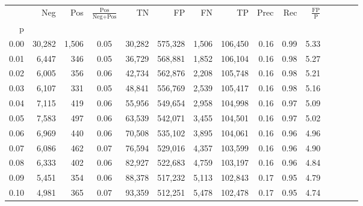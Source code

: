 \begin{tabular}{rrrcrrrrrrrrrrr}
\toprule
{} &     Neg &    Pos & $\frac{\text{Pos}}{\text{Neg}+\text{Pos}}$ &       TN &       FP &       FN &       TP &  Prec &   Rec & $\frac{\text{FP}}{\text{P}}$ \\
p    &         &        &                                            &          &          &          &          &       &       &                              \\
\midrule
0.00 &  30,282 &  1,506 &                                       0.05 &   30,282 &  575,328 &    1,506 &  106,450 &  0.16 &  0.99 &                         5.33 \\
0.01 &   6,447 &    346 &                                       0.05 &   36,729 &  568,881 &    1,852 &  106,104 &  0.16 &  0.98 &                         5.27 \\
0.02 &   6,005 &    356 &                                       0.06 &   42,734 &  562,876 &    2,208 &  105,748 &  0.16 &  0.98 &                         5.21 \\
0.03 &   6,107 &    331 &                                       0.05 &   48,841 &  556,769 &    2,539 &  105,417 &  0.16 &  0.98 &                         5.16 \\
0.04 &   7,115 &    419 &                                       0.06 &   55,956 &  549,654 &    2,958 &  104,998 &  0.16 &  0.97 &                         5.09 \\
0.05 &   7,583 &    497 &                                       0.06 &   63,539 &  542,071 &    3,455 &  104,501 &  0.16 &  0.97 &                         5.02 \\
0.06 &   6,969 &    440 &                                       0.06 &   70,508 &  535,102 &    3,895 &  104,061 &  0.16 &  0.96 &                         4.96 \\
0.07 &   6,086 &    462 &                                       0.07 &   76,594 &  529,016 &    4,357 &  103,599 &  0.16 &  0.96 &                         4.90 \\
0.08 &   6,333 &    402 &                                       0.06 &   82,927 &  522,683 &    4,759 &  103,197 &  0.16 &  0.96 &                         4.84 \\
0.09 &   5,451 &    354 &                                       0.06 &   88,378 &  517,232 &    5,113 &  102,843 &  0.17 &  0.95 &                         4.79 \\
0.10 &   4,981 &    365 &                                       0.07 &   93,359 &  512,251 &    5,478 &  102,478 &  0.17 &  0.95 &                         4.74 \\

\end{tabular}

